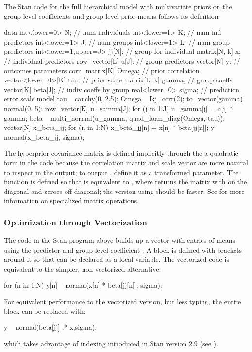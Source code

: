 The Stan code for the full hierarchical model with multivariate priors
on the group-level coefficients and group-level prior means follows
its definition.
%
\begin{stancode}
data {
  int<lower=0> N;              // num individuals
  int<lower=1> K;              // num ind predictors
  int<lower=1> J;              // num groups
  int<lower=1> L;              // num group predictors
  int<lower=1,upper=J> jj[N];  // group for individual
  matrix[N, k] x;               // individual predictors
  row_vector[L] u[J];          // group predictors
  vector[N] y;                 // outcomes
}
parameters {
  corr_matrix[K] Omega;        // prior correlation
  vector<lower=0>[K] tau;      // prior scale
  matrix[L, k] gamma;           // group coeffs
  vector[K] beta[J];           // indiv coeffs by group
  real<lower=0> sigma;         // prediction error scale
}
model {
  tau ~ cauchy(0, 2.5);
  Omega ~ lkj_corr(2);
  to_vector(gamma) ~ normal(0, 5);
  {
    row_vector[K] u_gamma[J];
    for (j in 1:J)
      u_gamma[j] = u[j] * gamma;
    beta ~ multi_normal(u_gamma, quad_form_diag(Omega, tau));
  }
  {
    vector[N] x_beta_jj;
    for (n in 1:N)
      x_beta_jj[n] = x[n] * beta[jj[n]];
    y ~ normal(x_beta_jj, sigma);
  }
}
\end{stancode}
%
The hyperprior covariance matrix is defined implicitly through the
a quadratic form in the code 
because the correlation matrix  and scale vector
 are more natural to inspect in the output; to output
, define it as a transformed parameter.  The function
 is defined so that
 is equivalent to
, where
 returns the matrix with  on the
diagonal and zeroes off diagonal; the version using
 should be faster.  See
 for more information on
specialized matrix operations.

\subsubsection{Optimization through Vectorization}

The code in the Stan program above builds up a vector with entries
 of means using the predictor  and
group-level coefficient .  A block is defined with
brackets around it so that  can be declared as a
local variable.  The vectorized code is equivalent to the simpler,
non-vectorized alternative:
%
\begin{stancode}
  for (n in 1:N)
    y[n] ~ normal(x[n] * beta[jj[n]], sigma);
\end{stancode}
%
For equivalent performance to the vectorized version, but less typing, the entire block can be replaced with:
%
\begin{stancode}
  y ~ normal(beta[jj] .* x,sigma);
\end{stancode}
%
which takes advantage of indexing introduced in Stan version 2.9 (see ).

